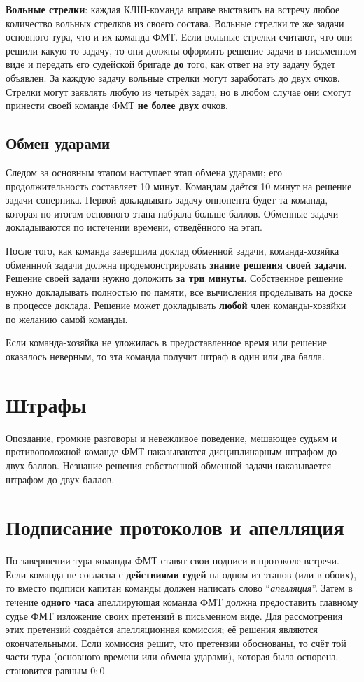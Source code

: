 \documentclass[12pt,a4paper]{article}
\begin{document}
{\bf Вольные стрелки}: каждая КЛШ-команда вправе выставить на встречу любое количество вольных стрелков из своего состава. Вольные стрелки те же задачи основного тура, что и их команда ФМТ. Если вольные стрелки считают, что они решили какую-то задачу, то они должны оформить решение задачи в письменном виде и передать его судейской бригаде \textbf{до} того, как ответ на эту задачу будет объявлен. За каждую задачу вольные стрелки могут заработать до двух очков. Стрелки могут заявлять любую из четырёх задач, но в любом случае они смогут принести своей команде ФМТ \textbf{не более двух} очков.

\subsection{Обмен ударами}
Следом за основным этапом наступает этап обмена ударами; его продолжительность составляет 10 минут. Командам даётся 10 минут на решение задачи соперника. Первой докладывать задачу оппонента будет та команда, которая по итогам основного этапа набрала больше баллов. Обменные задачи докладываются по истечении времени, отведённого на этап.

После того, как команда завершила доклад обменной задачи, команда-хозяйка обменнной задачи должна продемонстрировать \textbf{знание решения своей задачи}. Решение своей задачи нужно доложить \textbf{за три минуты}. Собственное решение нужно докладывать полностью по памяти, все вычисления проделывать на доске в процессе доклада. Решение может докладывать {\bf любой} член команды-хозяйки по желанию самой команды.

Если команда-хозяйка не уложилась в предоставленное время или решение оказалось неверным, то эта команда получит штраф в один или два балла.

\section{Штрафы}
Опоздание, громкие разговоры и невежливое поведение, мешающее судьям и противоположной команде ФМТ наказываются дисциплинарным штрафом до двух баллов. Незнание решения собственной обменной задачи наказывается штрафом до двух баллов.

\section{Подписание протоколов и апелляция}
По завершении тура команды ФМТ ставят свои подписи в протоколе встречи. Если команда не согласна с {\bf действиями судей} на одном из этапов (или в обоих), то вместо подписи капитан команды должен написать слово ``\textsl{апелляция}''. Затем в течение {\bf одного часа} апеллирующая команда ФМТ должна предоставить главному судье ФМТ изложение своих претензий в письменном виде. Для рассмотрения этих претензий создаётся апелляционная комиссия; её решения являются окончательными. Если комиссия решит, что претензии обоснованы, то счёт той части тура (основного времени или обмена ударами), которая была оспорена, становится равным $0:0$.
\end{document}
